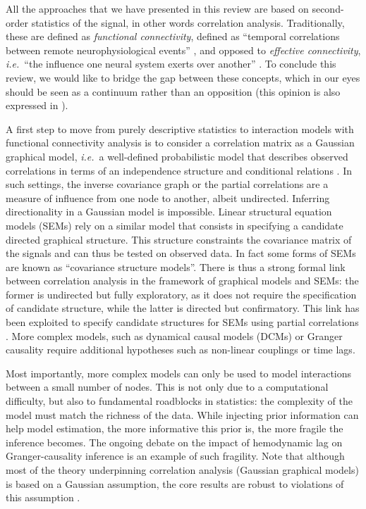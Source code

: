\documentclass[5p]{elsarticle}
\begin{document}
All the approaches that we have presented in this review are based on
second-order statistics of the signal, in other words correlation
analysis. Traditionally, these are defined as \emph{functional
connectivity}, defined as ``temporal correlations between remote
neurophysiological events'' \cite{friston1994}, and opposed to
\emph{effective connectivity}, \emph{i.e.}\ ``the influence one neural
system exerts over another'' \cite{friston1994}. To conclude this review,
we would like to bridge the gap between these concepts, which in our eyes
should be seen as a continuum rather than an opposition (this opinion is
also expressed in \cite{mcintosh2010}).

A first step to move from purely descriptive statistics to interaction
models with
functional connectivity analysis is to consider a correlation matrix as a
Gaussian graphical model, \emph{i.e.}\ a well-defined probabilistic model
that describes observed correlations in terms of an independence
structure and conditional relations \cite{lauritzen1996,varoquaux2012}.
In such settings, the inverse covariance graph or the partial
correlations are a measure of influence from one node to another, albeit
undirected. Inferring directionality in a Gaussian model is impossible. Linear
structural equation models (SEMs) \cite{mcintosh1994} rely on a similar
model that consists in specifying a candidate directed graphical
structure. This structure constraints the covariance matrix of the
signals and can thus be tested on observed data. In fact some forms of
SEMs are known as ``covariance structure models''. There is thus a strong
formal link between correlation analysis in the framework of graphical
models and SEMs: the former is undirected but fully exploratory, as it
does not require the specification of candidate structure, while the
latter is directed but confirmatory. This link has been exploited to
specify candidate structures for SEMs using partial correlations
\cite{marrelec2007}. More complex models, such as dynamical causal models
(DCMs) \cite{friston2003a} or Granger causality \cite{goebel2003} require
additional hypotheses such as non-linear couplings or time lags.

Most importantly, more complex models can only be used to model
interactions between a small number of nodes. This is not only due to a
computational difficulty, but also to fundamental roadblocks in
statistics: the complexity of the model must match the richness of the
data. While injecting prior information can help model estimation, the
more informative this prior is, the more fragile the inference becomes. The
ongoing debate on the impact of hemodynamic lag on Granger-causality
inference \cite{smith2012a} is an example of such fragility.
Note that although most of the theory underpinning correlation analysis
(Gaussian graphical models) is based on a Gaussian assumption, the core results
are robust to violations of this assumption \cite{ravikumar2011}.
\end{document}
